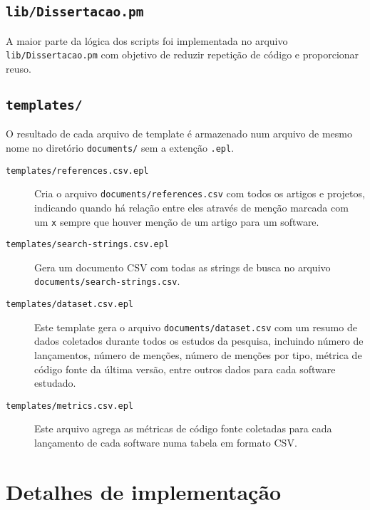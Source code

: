 \subsection{\texttt{lib/Dissertacao.pm}}

A maior parte da lógica dos scripts foi implementada no arquivo
\texttt{lib/Dissertacao.pm} com objetivo de reduzir repetição de código e
proporcionar reuso.

\subsection{\texttt{templates/}}

O resultado de cada arquivo de template é armazenado num arquivo de mesmo nome
no diretório \texttt{documents/} sem a extenção \texttt{.epl}.

\begin{description}

  \item [\texttt{templates/references.csv.epl}]
    Cria o arquivo \texttt{documents/references.csv} com todos os artigos e
    projetos, indicando quando há relação entre eles através de menção marcada
    com um \texttt{x} sempre que houver menção de um artigo para um software.

  \item [\texttt{templates/search-strings.csv.epl}]
    Gera um documento CSV com todas as strings de busca no arquivo
    \texttt{documents/search-strings.csv}.

  \item [\texttt{templates/dataset.csv.epl}]
    Este template gera o arquivo \texttt{documents/dataset.csv} com um resumo de
    dados coletados durante todos os estudos da pesquisa, incluindo número de lançamentos,
    número de menções, número de menções por tipo, métrica de código fonte da última
    versão, entre outros dados para cada software estudado.

  \item [\texttt{templates/metrics.csv.epl}]
    Este arquivo agrega as métricas de código fonte coletadas para cada lançamento
    de cada software numa tabela em formato CSV.


\end{description}

\section{Detalhes de implementação}

